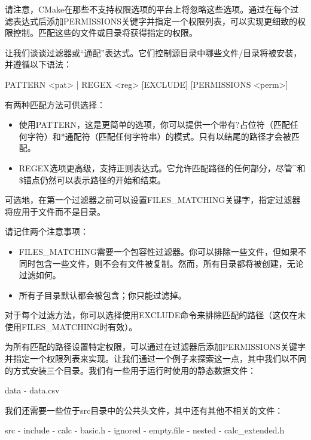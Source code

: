 请注意，CMake在那些不支持权限选项的平台上将忽略这些选项。通过在每个过滤表达式后添加PERMISSIONS关键字并指定一个权限列表，可以实现更细致的权限控制。匹配这些的文件或目录将获得指定的权限。

让我们谈谈过滤器或“通配”表达式。它们控制源目录中哪些文件/目录将被安装，并遵循以下语法：

\begin{shell}
PATTERN <pat> | REGEX <reg> [EXCLUDE] [PERMISSIONS <perm>]
\end{shell}

有两种匹配方法可供选择：

\begin{itemize}
\item
使用PATTERN，这是更简单的选项，你可以提供一个带有?占位符（匹配任何字符）和*通配符（匹配任何字符串）的模式。只有以结尾的路径才会被匹配。

\item
REGEX选项更高级，支持正则表达式。它允许匹配路径的任何部分，尽管\^{}和\$锚点仍然可以表示路径的开始和结束。
\end{itemize}

可选地，在第一个过滤器之前可以设置FILES\_MATCHING关键字，指定过滤器将应用于文件而不是目录。

请记住两个注意事项：

\begin{itemize}
\item
FILES\_MATCHING需要一个包容性过滤器。你可以排除一些文件，但如果不同时包含一些文件，则不会有文件被复制。然而，所有目录都将被创建，无论过滤如何。

\item
所有子目录默认都会被包含；你只能过滤掉。
\end{itemize}

对于每个过滤方法，你可以选择使用EXCLUDE命令来排除匹配的路径（这仅在未使用FILES\_MATCHING时有效）。

为所有匹配的路径设置特定权限，可以通过在过滤器后添加PERMISSIONS关键字并指定一个权限列表来实现。让我们通过一个例子来探索这一点，其中我们以不同的方式安装三个目录。我们有一些用于运行时使用的静态数据文件：

\begin{shell}
data
- data.csv
\end{shell}

我们还需要一些位于src目录中的公共头文件，其中还有其他不相关的文件：

\begin{shell}
src
- include
  - calc
    - basic.h
    - ignored
      - empty.file
    - nested
      - calc_extended.h
\end{shell}


